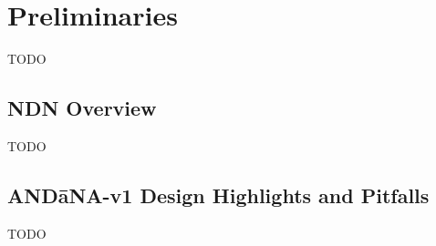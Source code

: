 \section{Preliminaries} \label{sec:preliminaries}
TODO

\subsection{NDN Overview}
TODO

\subsection{AND\=aNA-v1 Design Highlights and Pitfalls}
TODO